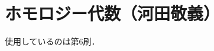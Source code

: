\documentclass[a4paper, leqno]{ltjsreport}
\begin{document}
\chapter*{ホモロジー代数（河田敬義）}
使用しているのは第6刷．

\tableofcontents





\end{document}
